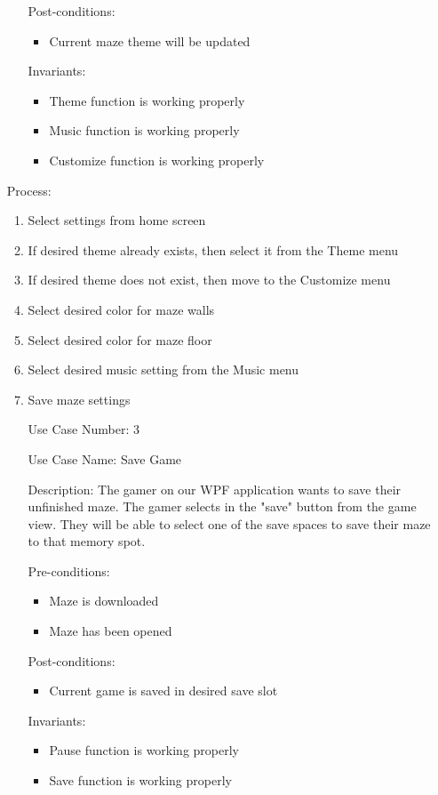 \documentclass[10pt,conference,onecolumn,compsoc]{IEEEtran}
\begin{document}
\begin{itemize}
\begin{itemize}
\item[Post-conditions:]
\begin{itemize} 
\item Current maze theme will be updated
\end{itemize}
\item[Invariants:]
\begin{itemize} 
\item Theme function is working properly
\item Music function is working properly
\item Customize function is working properly

\end{itemize}
\end{itemize}

\item[Process:]
\begin{enumerate}
\item Select settings from home screen
\item If desired theme already exists, then select it from the Theme menu
\item If desired theme does not exist, then move to the Customize menu
\item Select desired color for maze walls
\item Select desired color for maze floor
\item Select desired music setting from the Music menu
\item Save maze settings
\end{enumerate}
\begin{itemize}
\item[Use Case Number:] 3
\item[Use Case Name:] Save Game
\item[Description:] The gamer on our WPF application wants to save their unfinished maze. The gamer selects in the "save" button from the game view. They will be able to select one of the save spaces to save their maze to that memory spot.
\item[Pre-conditions:]
\begin{itemize} 
\item Maze is downloaded
\item Maze has been opened
\end{itemize}

\item[Post-conditions:]
\begin{itemize} 
\item Current game is saved in desired save slot
\end{itemize}
\item[Invariants:]
\begin{itemize} 
\item Pause function is working properly
\item Save function is working properly
\end{itemize}


\end{itemize}
\end{itemize}
\end{document}
